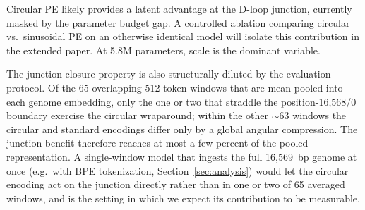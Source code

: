 \documentclass[10pt]{article}
\begin{document}
Circular PE likely provides a latent advantage at the D-loop junction, currently masked by
the parameter budget gap. A controlled ablation comparing circular vs.\ sinusoidal PE on an
otherwise identical model will isolate this contribution in the extended paper. At 5.8M
parameters, scale is the dominant variable.

The junction-closure property is also structurally diluted by the evaluation protocol. Of the 65
overlapping 512-token windows that are mean-pooled into each genome embedding, only the one or two
that straddle the position-16,568/0 boundary exercise the circular wraparound; within the other
$\sim$63 windows the circular and standard encodings differ only by a global angular compression.
The junction benefit therefore reaches at most a few percent of the pooled representation. A
single-window model that ingests the full 16,569~bp genome at once (e.g.\ with BPE tokenization,
Section~\ref{sec:analysis}) would let the circular encoding act on the junction directly rather
than in one or two of 65 averaged windows, and is the setting in which we expect its contribution
to be measurable.
\end{document}
